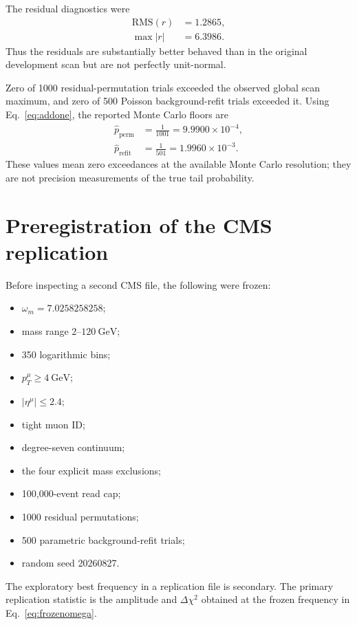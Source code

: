 \documentclass[11pt]{article}
\begin{document}
The residual diagnostics were
\begin{align}
\mathrm{RMS}(r)&=1.2865,\\
\max|r|&=6.3986.
\end{align}
Thus the residuals are substantially better behaved than in the original
development scan but are not perfectly unit-normal.

Zero of 1000 residual-permutation trials exceeded the observed global scan
maximum, and zero of 500 Poisson background-refit trials exceeded it.  Using
Eq.~\eqref{eq:addone}, the reported Monte Carlo floors are
\begin{align}
\hat p_{\mathrm{perm}} &= \frac{1}{1001}
=9.9900\times10^{-4},\\
\hat p_{\mathrm{refit}} &= \frac{1}{501}
=1.9960\times10^{-3}.
\end{align}
These values mean zero exceedances at the available Monte Carlo resolution;
they are not precision measurements of the true tail probability.

\section{Preregistration of the CMS replication}

Before inspecting a second CMS file, the following were frozen:
\begin{itemize}
    \item \(\omega_m=7.0258258258\);
    \item mass range \(2\)--\(120~\mathrm{GeV}\);
    \item 350 logarithmic bins;
    \item \(p_T^\mu\ge4~\mathrm{GeV}\);
    \item \(|\eta^\mu|\le2.4\);
    \item tight muon ID;
    \item degree-seven continuum;
    \item the four explicit mass exclusions;
    \item 100,000-event read cap;
    \item 1000 residual permutations;
    \item 500 parametric background-refit trials;
    \item random seed 20260827.
\end{itemize}

The exploratory best frequency in a replication file is secondary.  The
primary replication statistic is the amplitude and \(\Delta\chi^2\) obtained
at the frozen frequency in Eq.~\eqref{eq:frozenomega}.
\end{document}
